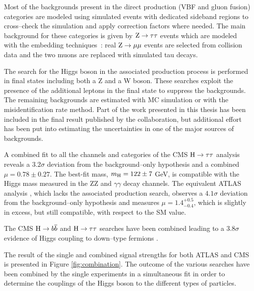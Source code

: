 Most of the backgrounds present in the direct production (VBF and gluon fusion) categories are modeled using simulated events with dedicated sideband regions to cross--check the simulation and apply correction factors where needed. The main background for these categories is given by $\mathrm{Z} \rightarrow \tau\tau$ events which are modeled with the embedding techniques~\cite{CMS_AN_2011-020}: real $\mathrm{Z} \rightarrow \mu \mu$ events are selected from collision data and the two muons are replaced with simulated tau decays.

The search for the Higgs boson in the associated production process is performed in final states including both a Z and a W boson. These searches exploit the presence of the additional leptons in the final state to suppress the backgrounds. The remaining backgrounds are estimated with MC simulation or with the misidentification rate method. Part of the work presented in this thesis has been included in the final result published by the collaboration, but additional effort has been put into estimating the uncertainties in one of the major sources of backgrounds. 

A combined fit to all the channels and categories of the CMS $\mathrm{H} \rightarrow \tau\tau$ analysis reveals a $3.2\sigma$ deviation from the background--only hypothesis and a combined $\mu = 0.78 \pm 0.27$.%
The best-fit mass, $m_{\mathrm{H}} = 122 \pm 7$ GeV, is compatible with the Higgs mass measured in the ZZ and $\gamma\gamma$ decay channels. The equivalent ATLAS analysis \cite{ATLASCONF:2013108}, which lacks the associated production search, observes a $4.1\sigma$ deviation from the background--only hypothesis and measures $\mu = 1.4^{+0.5}_{-0.4}$, which is slightly in excess, but still compatible, with respect to the SM value.

The CMS $\mathrm{H} \rightarrow b\overline{b}$ and $\mathrm{H} \rightarrow \tau \tau$ searches have been combined leading to a $3.8\sigma$ evidence of Higgs coupling to down--type fermions \cite{Chatrchyan:2014vua}.

The result of the single and combined signal strengths for both ATLAS \cite{ATLASCONF:2014009} and CMS \cite{CMS:2014ega} is presented in Figure \ref{fig:combination}.
The outcome of the various searches have been combined by the single experiments in a simultaneous fit in order to determine the couplings of the Higgs boson to the different types of particles. 

